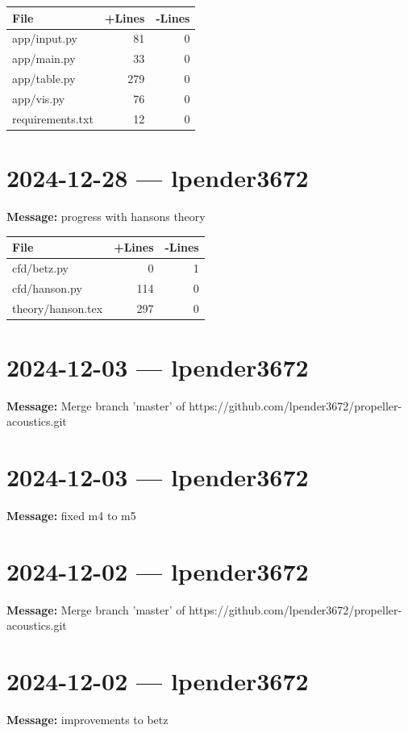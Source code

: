 \documentclass{article}
\begin{document}
\begin{longtable}{|p{10cm}|r|r|}
\hline \textbf{File} & \textbf{+Lines} & \textbf{-Lines} \\
\hline
app/input.py & 81 & 0 \\
\hline
app/main.py & 33 & 0 \\
\hline
app/table.py & 279 & 0 \\
\hline
app/vis.py & 76 & 0 \\
\hline
requirements.txt & 12 & 0 \\
\hline
\end{longtable}

\section*{2024-12-28 --- lpender3672}
\textbf{Message:} progress with hansons theory

\begin{longtable}{|p{10cm}|r|r|}
\hline \textbf{File} & \textbf{+Lines} & \textbf{-Lines} \\
\hline
cfd/betz.py & 0 & 1 \\
\hline
cfd/hanson.py & 114 & 0 \\
\hline
theory/hanson.tex & 297 & 0 \\
\hline
\end{longtable}

\section*{2024-12-03 --- lpender3672}
\textbf{Message:} Merge branch 'master' of https://github.com/lpender3672/propeller-acoustics.git

\section*{2024-12-03 --- lpender3672}
\textbf{Message:} fixed m4 to m5

\section*{2024-12-02 --- lpender3672}
\textbf{Message:} Merge branch 'master' of https://github.com/lpender3672/propeller-acoustics.git

\section*{2024-12-02 --- lpender3672}
\textbf{Message:} improvements to betz
\end{document}

